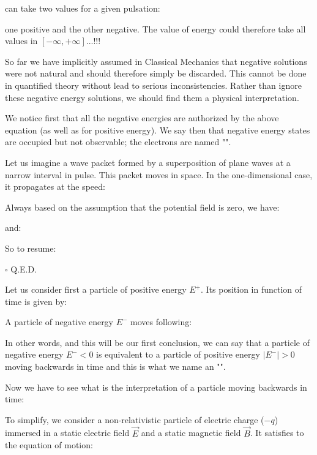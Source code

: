 	can take two values for a given pulsation:
	
	one positive and the other negative. The value of energy could therefore take all values in $[-\infty,+\infty]$...!!!
	
	So far we have implicitly assumed in Classical Mechanics that negative solutions were not natural and should therefore simply be discarded. This cannot be done in quantified theory without lead to serious inconsistencies. Rather than ignore these negative energy solutions, we should find them a physical interpretation.
	
	We notice first that all the negative energies are authorized by the above equation (as well as for positive energy). We say then that negative energy states are occupied but not observable; the electrons are named "".
	   	\begin{theorem}
	Let us imagine a wave packet formed by a superposition of plane waves at a narrow interval in pulse. This packet moves in space. In the one-dimensional case, it propagates at the speed:
	
	\end{theorem}
	\begin{dem}
	Always based on the assumption that the potential field is zero, we have:
	
	and:
	
	So to resume:
	
	\begin{flushright}
		$\square$  Q.E.D.
	\end{flushright}
	\end{dem}
	Let us consider first a particle of positive energy $E^+$. Its position in function of time is given by:
	
	A particle of negative energy $E^-$ moves following:
	
	In other words, and this will be our first conclusion, we can say that a particle of negative energy $E^-<0$ is equivalent to a particle of positive energy $|E^-|>0$ moving backwards in time and this is what we name an "".
	
	Now we have to see what is the interpretation of a particle moving backwards in time:
	
	To simplify, we consider a non-relativistic particle of electric charge ($-q$) immersed in a static electric field $\vec{E}$ and a static magnetic field $\vec{B}$. It satisfies to the equation of motion:
	
